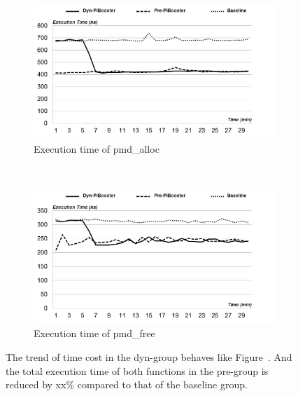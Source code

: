 \begin{figure}[t!]
    \centering
    \begin{subfigure}[t]{0.5\textwidth}
        \centering
        \includegraphics[height=2.0in]{image/micro/PMDalloc.png}
        \caption{Execution time of pmd\_alloc}
        \label{fig:subfig:a}
    \end{subfigure}%
    ~
    \begin{subfigure}[t]{0.5\textwidth}
        \centering
        \includegraphics[height=2.0in]{image/micro/PMDfree.png}
        \caption{Execution time of pmd\_free}
        \label{fig:subfig:b}
    \end{subfigure}
    \caption{The trend of time cost in the dyn-\name group behaves like Figure~\cite{fig:PGDtime}. And the total execution time of both functions in the pre-\name group is reduced by xx\% compared to that of the baseline group.}
    \label{fig:PMDtime}
\end{figure}

